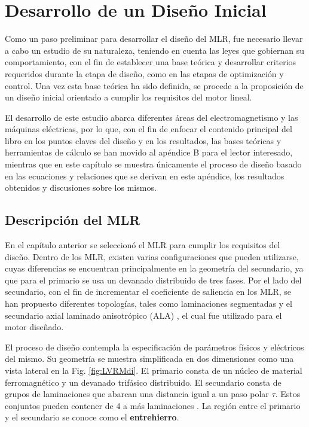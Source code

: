 \chapter{Desarrollo de un Diseño Inicial}

Como un paso preliminar para desarrollar el diseño del MLR, fue necesario llevar a cabo un estudio de su naturaleza, teniendo en cuenta las leyes que gobiernan su comportamiento, con el fin de establecer una base teórica y desarrollar criterios requeridos durante la etapa de diseño, como en las etapas de optimización y control. Una vez esta base teórica ha sido definida, se procede a la proposición de un diseño inicial orientado a cumplir los requisitos del motor lineal.

El desarrollo de este estudio abarca diferentes áreas del electromagnetismo y las máquinas eléctricas, por lo que, con el fin de enfocar el contenido principal del libro en los puntos claves del diseño y en los resultados, las bases teóricas y herramientas de cálculo se han movido al apéndice B para el lector interesado, mientras que en este capítulo se muestra únicamente el proceso de diseño basado en las ecuaciones y relaciones que se derivan en este apéndice, los resultados obtenidos y discusiones sobre los mismos.

\section{Descripción del MLR}
En el capítulo anterior se seleccionó el MLR para cumplir los requisitos del diseño. Dentro de los MLR, existen varias configuraciones que pueden utilizarse, cuyas diferencias se encuentran principalmente en la geometría del secundario, ya que para el primario se usa un devanado distribuido de tres fases. Por el lado del secundario, con el fin de incrementar el coeficiente de saliencia en los MLR, se han propuesto diferentes topologías, tales como laminaciones segmentadas \cite{lawrenson1967} y el secundario axial laminado anisotrópico (ALA) \cite{cruickshank1966,hamler1998,kostko1923,leekimlee2014}, el cual fue utilizado para el motor diseñado.

El proceso de diseño contempla la especificación de parámetros físicos y eléctricos del mismo. Su geometría se muestra simplificada en dos dimensiones como una vista lateral en la Fig. \ref{fig:LVRMdi}. El primario consta de un núcleo de material ferromagnético y un devanado trifásico distribuido. El secundario consta de grupos de laminaciones que abarcan una distancia igual a un paso polar $\tau$. Estos conjuntos pueden contener de 4 a más laminaciones \cite{boldea2013}. La región entre el primario y el secundario se conoce como el \textbf{entrehierro}.

